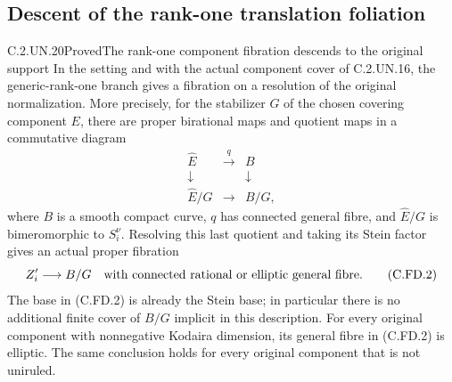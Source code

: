 \subsection{Descent of the rank-one translation foliation}

\begin{statement}{C.2.UN.20}{Proved}{The rank-one component fibration descends to the original support}
In the setting and with the actual component cover of C.2.UN.16,
the generic-rank-one branch gives a fibration on a resolution of
the original normalization. More precisely, for the stabilizer
$G$ of the chosen covering component $E$, there are proper
birational maps and quotient maps in a commutative diagram
\[
\begin{array}{ccc}
 \widehat E&\xrightarrow{\ q\ }&B\\
 \downarrow&&\downarrow\\
 \widehat E/G&\longrightarrow&B/G,
\end{array}                                                    \tag{C.FD.1}
\]
where $B$ is a smooth compact curve, $q$ has connected general
fibre, and $\widehat E/G$ is bimeromorphic to $S_i^\nu$.
Resolving this last quotient and taking its Stein factor gives
an actual proper fibration
\[
        Z'_i\longrightarrow B/G
        \quad\hbox{with connected rational or elliptic general fibre}.
                                                               \tag{C.FD.2}
\]
The base in (C.FD.2) is already the Stein base; in particular
there is no additional finite cover of $B/G$ implicit in this
description. For every original component with nonnegative
Kodaira dimension, its general fibre in (C.FD.2) is elliptic.
The same conclusion holds for every original component that
is not uniruled.
\end{statement}
